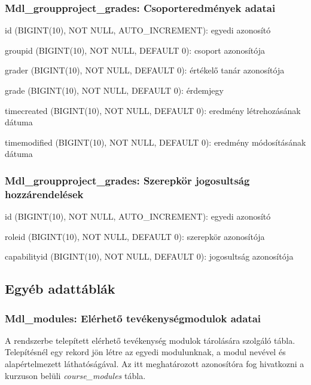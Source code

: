 \subsubsection{ {\textbf{Mdl\_groupproject\_grades: Csoporteredmények adatai}}}
\begin{compactitem}
	\item id (BIGINT(10), NOT NULL, AUTO\_INCREMENT): egyedi azonosító
    \item groupid (BIGINT(10), NOT NULL, DEFAULT 0): csoport azonosítója
    \item grader (BIGINT(10), NOT NULL, DEFAULT 0): értékelő tanár azonosítója
    \item grade (BIGINT(10), NOT NULL, DEFAULT 0): érdemjegy
    \item timecreated (BIGINT(10), NOT NULL, DEFAULT 0): eredmény létrehozásának dátuma
    \item timemodified (BIGINT(10), NOT NULL, DEFAULT 0): eredmény módosításának dátuma
 \end{compactitem} 

\subsubsection{  {\textbf{Mdl\_groupproject\_grades: Szerepkör jogosultság hozzárendelések}}}
\begin{compactitem}
	\item id (BIGINT(10), NOT NULL, AUTO\_INCREMENT): egyedi azonosító
    \item roleid (BIGINT(10), NOT NULL, DEFAULT 0): szerepkör azonosítója
    \item capabilityid (BIGINT(10), NOT NULL, DEFAULT 0): jogosultság azonosítója
 \end{compactitem} 

\subsection{Egyéb adattáblák} \label{adat:egyeb-1}

\subsubsection{{\textbf{Mdl\_modules: Elérhető tevékenységmodulok adatai}}}
 
A rendszerbe telepített elérhető tevékenység modulok tárolására szolgáló tábla. Telepítésnél egy rekord jön létre az egyedi modulunknak, a modul nevével és alapértelmezett láthatóságával. Az itt meghatározott azonosítóra fog hivatkozni a kurzuson belüli \textit{course\_modules} tábla.

